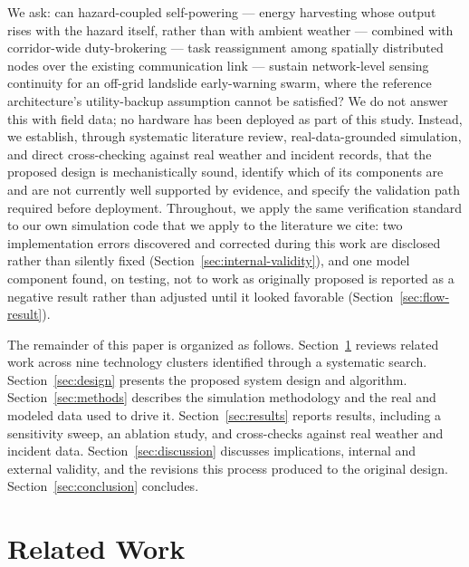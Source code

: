 \documentclass[electronics,article,submit,moreauthors]{Definitions/mdpi}
\begin{document}
We ask: can hazard-coupled self-powering --- energy harvesting whose output rises with the hazard itself, rather than with ambient weather --- combined with corridor-wide duty-brokering --- task reassignment among spatially distributed nodes over the existing communication link --- sustain network-level sensing continuity for an off-grid landslide early-warning swarm, where the reference architecture's utility-backup assumption cannot be satisfied? We do not answer this with field data; no hardware has been deployed as part of this study. Instead, we establish, through systematic literature review, real-data-grounded simulation, and direct cross-checking against real weather and incident records, that the proposed design is mechanistically sound, identify which of its components are and are not currently well supported by evidence, and specify the validation path required before deployment. Throughout, we apply the same verification standard to our own simulation code that we apply to the literature we cite: two implementation errors discovered and corrected during this work are disclosed rather than silently fixed (Section~\ref{sec:internal-validity}), and one model component found, on testing, not to work as originally proposed is reported as a negative result rather than adjusted until it looked favorable (Section~\ref{sec:flow-result}).

The remainder of this paper is organized as follows. Section~\ref{sec:related} reviews related work across nine technology clusters identified through a systematic search. Section~\ref{sec:design} presents the proposed system design and algorithm. Section~\ref{sec:methods} describes the simulation methodology and the real and modeled data used to drive it. Section~\ref{sec:results} reports results, including a sensitivity sweep, an ablation study, and cross-checks against real weather and incident data. Section~\ref{sec:discussion} discusses implications, internal and external validity, and the revisions this process produced to the original design. Section~\ref{sec:conclusion} concludes.

\section{Related Work}
\label{sec:related}
\end{document}

